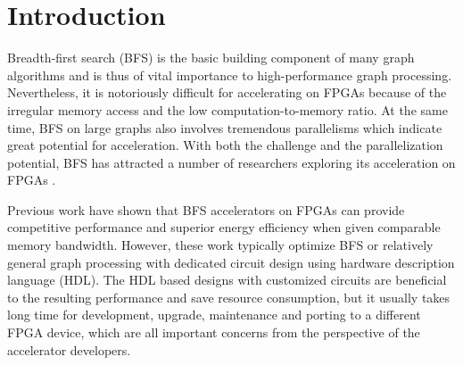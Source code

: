 \section{Introduction} \label{sec:intro}
 
Breadth-first search (BFS) is the basic building component of many graph algorithms 
and is thus of vital importance to high-performance graph processing. Nevertheless, 
it is notoriously difficult for accelerating on FPGAs because of the 
irregular memory access and the low 
computation-to-memory ratio. At the same time, BFS on large graphs also involves 
tremendous parallelisms which indicate great potential for acceleration. 
With both the challenge and the parallelization potential, 
BFS has attracted a number of researchers exploring its acceleration on FPGAs 
\cite{attia2014cygraph, betkaoui2012reconfigurable, Dai2017foregraph, Ma2017fpga,
umuroglu2015hybrid, oguntebi2016graphops, engelhardt2016gravf, zhou2016high}. 

Previous work have shown that BFS accelerators on FPGAs can provide competitive  
performance and superior energy efficiency when given comparable memory bandwidth. 
However, these work typically optimize BFS or relatively general graph processing 
with dedicated circuit design using hardware description language (HDL). The HDL 
based designs with customized circuits are beneficial to the resulting performance 
and save resource consumption, but it usually takes long time for development, 
upgrade, maintenance and porting to a different FPGA device, which are all 
important concerns from the perspective of the accelerator developers. 


